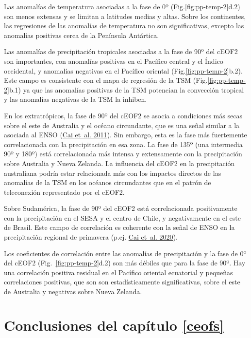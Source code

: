 \documentclass[12pt,oneside,a4paper]{reedthesis}
\begin{document}
Las anomalías de temperatura asociadas a la fase de 0º (Fig.\ref{fig:pp-temp-2}d.2) son menos extensas y se limitan a latitudes medias y altas.
Sobre los continentes, las regresiones de las anomalías de temperatura no son significativas, excepto las anomalías positivas cerca de la Península Antártica.

Las anomalías de precipitación tropicales asociadas a la fase de 90º del cEOF2 son importantes, con anomalías positivas en el Pacífico central y el Índico occidental, y anomalías negativas en el Pacífico oriental (Fig.\ref{fig:pp-temp-2}b.2).
Este campo es consistente con el mapa de regresión de la TSM (Fig.\ref{fig:pp-temp-2}b.1) ya que las anomalías positivas de la TSM potencian la convección tropical y las anomalías negativas de la TSM la inhiben.

En los extratrópicos, la fase de 90º del cEOF2 se asocia a condiciones más secas sobre el este de Australia y el océano circundante, que es una señal similar a la asociada al ENSO (\protect\hyperlink{ref-cai2011}{Cai et~al. 2011}).
Sin embargo, esta es la fase más fuertemente correlacionada con la precipitación en esa zona.
La fase de 135º (una intermedia 90º y 180º) está correlacionada más intensa y extensamente con la precipitación sobre Australia y Nueva Zelanda.
La influencia del cEOF2 en la precipitación australiana podría estar relacionada más con los impactos directos de las anomalías de la TSM en los océanos circundantes que en el patrón de teleconexión representado por el cEOF2.

Sobre Sudamérica, la fase de 90º del cEOF2 está correlacionada positivamente con la precipitación en el SESA y el centro de Chile, y negativamente en el este de Brasil.
Este campo de correlación es coherente con la señal de ENSO en la precipitación regional de primavera (p.ej. \protect\hyperlink{ref-cai2020a}{Cai et~al. 2020}).

Los coeficientes de correlación entre las anomalías de precipitación y la fase de 0º del cEOF2 (Fig.~\ref{fig:pp-temp-2}d.2) son más débiles que para la fase de 90º.
Hay una correlación positiva residual en el Pacífico oriental ecuatorial y pequeñas correlaciones positivas, que son son estadísticamente significativas, sobre el este de Australia y negativas sobre Nueva Zelanda.

\hypertarget{conclusiones-del-capuxedtulo-refceofs}{%
\section{Conclusiones del capítulo \ref{ceofs}}\label{conclusiones-del-capuxedtulo-refceofs}}
\end{document}
